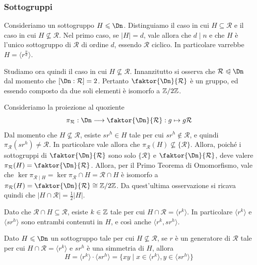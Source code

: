 \documentclass[11pt]{scrartcl}
\begin{document}
	
	\subsubsection{Sottogruppi}
	
	Consideriamo un sottogruppo $H\leqslant \Dn$. Distinguiamo il caso
	in cui
	$H \subseteq \mathcal{R}$ e il caso in cui $H \nsubseteq \mathcal{R}$. Nel primo caso,
	se $\lvert H \rvert = d$, vale allora che $d\mid n$ e che $H$ è l'unico sottogruppo di $\mathcal{R}$ di ordine $d$, essendo
	$\mathcal{R}$ ciclico. In particolare varrebbe $H = \langle r^{\frac{n}{d}} \rangle$. \medskip
	
	
	Studiamo ora quindi il caso in cui $H \nsubseteq \mathcal{R}$.
	Innanzitutto si osserva che
	$\mathcal{R}\trianglelefteqslant \Dn$ dal momento che
	$[\Dn : \mathcal{R}] = 2$.
	Pertanto $\faktor{\Dn}{\mathcal{R}}$ è un gruppo, ed essendo
	composto da due soli elementi è isomorfo a
	$\mathbb{Z}/{2}\mathbb{Z}$. \medskip
	
	
	Consideriamo la proiezione al quoziente 
	\[
	\pi_{\mathcal{R}}: \Dn \longrightarrow \faktor{\Dn}{\mathcal{R}} : g \mapsto g\mathcal{R}
	\]
	Dal momento che $H \nsubseteq \mathcal{R}$, esiste $sr^h \in H$ tale per
	cui 
	$sr^h \notin \mathcal{R}$, e quindi $\pi_{\mathcal{R}}(sr^h) \neq \mathcal{R}$.
	In particolare vale allora che $\pi_{\mathcal{R}}(H) \nsubseteq \{\mathcal{R}\}$. Allora, poiché i 
	sottogruppi di $\faktor{\Dn}{\mathcal{R}}$ sono solo $\{\mathcal{R}\}$ e
	$\faktor{\Dn}{\mathcal{R}}$, deve valere $\pi_{\mathcal{R}}(H) = 
	\faktor{\Dn}{\mathcal{R}}$. Allora, per il Primo Teorema
	di Omomorfismo, vale che $\ker \pi_{\mathcal{R}\mid H} = 
	\ker \pi_{\mathcal{R}} \cap H = \mathcal{R} \cap H$ è isomorfo
	a $\pi_{\mathcal{R}}(H) = \faktor{\Dn}{\mathcal{R}} \cong \Z2$.
	Da quest'ultima osservazione si ricava quindi che 
	$\lvert H\cap\mathcal{R} \rvert = \frac 1 2 \lvert H \rvert$. \medskip
	
	
	Dato che $\mathcal{R}\cap H \subseteq
	\mathcal{R}$, esiste $k \in \mathbb Z$ tale per cui $H\cap\mathcal{R} = \langle r^k\rangle$.
	In particolare $\langle r^k\rangle$ e $\langle sr^h\rangle$ sono
	entrambi contenuti in $H$, e così anche $\langle r^k, sr^h \rangle$. 
	
	\begin{proposition}
		Dato $H\leqslant \Dn$ un sottogruppo tale per cui $H\nsubseteq \mathcal{R}$, se
		$r$ è un generatore di $\mathcal{R}$ tale per cui $H\cap\mathcal{R} = \langle r^k\rangle$ 
		e $s r^h$ è una simmetria di $H$, allora \[
		H = \langle r^k\rangle\cdot\langle sr^h\rangle = \{xy \mid x \in \langle r^k\rangle,
		y \in \langle sr^h\rangle\} \]
	\end{proposition}
	
\end{document}
